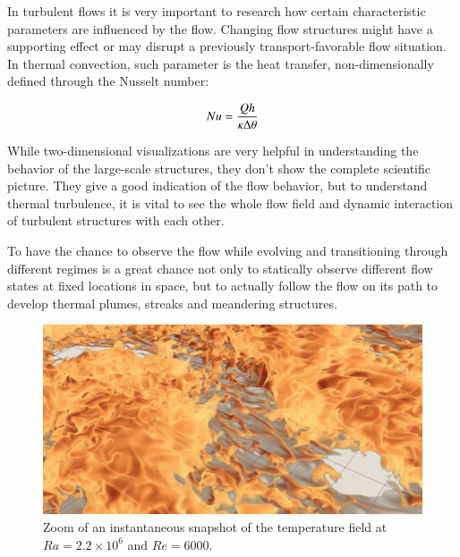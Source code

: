 \documentclass[final,5p,times,twocolumn]{elsarticle}
\begin{document}
In turbulent flows it is very important to research how certain characteristic
parameters are influenced by the flow. Changing flow structures might have a
supporting effect or may disrupt a previously transport-favorable flow situation. 
In thermal convection, such parameter is the heat transfer, non-dimensionally
defined through the Nusselt number:

\begin{equation} %
Nu= \frac{Qh}{\kappa \Delta \theta}
\label{eqn:nusselt} \\[8pt]
\end{equation} 



While two-dimensional visualizations are very helpful in understanding the behavior of the large-scale structures, they don't show the complete scientific picture. They give a good indication of the flow behavior, but to understand thermal turbulence, it is vital to see the whole flow field and dynamic interaction of turbulent structures with each other. 

To have the chance to observe the flow while evolving and transitioning through different regimes is a great chance not only to statically observe different flow states at fixed locations in space, but to actually follow the flow on its path to develop thermal plumes, streaks and meandering structures.

\begin{figure}
	\centering
	\includegraphics[width=\linewidth]{smallscale}%
	\caption{\label{fig:smallscale} Zoom of an instantaneous snapshot of the temperature field at $ Ra=2.2 \times 10^6 $ and $ Re=6000 $.}
\end{figure}
\end{document}
